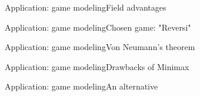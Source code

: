 \begin{frame}{Application: game modeling}{Field advantages}
\end{frame}

\begin{frame}{Application: game modeling}{Chosen game: "Reversi"}
\end{frame}

\begin{frame}{Application: game modeling}{Von Neumann's theorem}
\end{frame}

\begin{frame}{Application: game modeling}{Drawbacks of Minimax}
\end{frame}

\begin{frame}{Application: game modeling}{An alternative}
\end{frame}